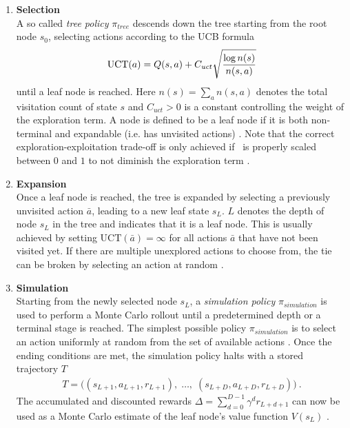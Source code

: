 \begin{enumerate}
    \item \textbf{Selection}\\
    A so called \emph{tree policy} $\pi_{tree}$ descends down the tree starting from the root node $s_0$, selecting actions according to the UCB formula
    \begin{gather}\label{eq:uct_formula}
        \text{UCT}(a) = \Q + C_{uct} \sqrt{\frac{\log n(s)}{n(s, a)}}
    \end{gather}
    until a leaf node is reached. Here $n(s) = \sum_a n(s, a)$ denotes the total visitation count of state $s$ and $C_{uct} > 0$ is a constant controlling the weight of the exploration term. A node is defined to be a leaf node if it is both non-terminal and expandable (i.e. has unvisited actions) \cite{browneSurveyMonteCarlo2012}.
    Note that the correct exploration-exploitation trade-off is only achieved if \Q\ is properly scaled between $0$ and $1$ to not diminish the exploration term \cite{browneSurveyMonteCarlo2012}.
    \item \textbf{Expansion}\\
    Once a leaf node is reached, the tree is expanded by selecting a previously unvisited action $\bar a$, leading to a new leaf state $s_L$. $L$ denotes the depth of node $s_L$ in the tree and indicates that it is a leaf node. This is usually achieved by setting $\text{UCT}(\bar a) = \infty$ for all actions $\bar a$ that have not been visited yet. If there are multiple unexplored actions to choose from, the tie can be broken by selecting an action at random \cite{browneSurveyMonteCarlo2012}.
    \item \textbf{Simulation}\\
    Starting from the newly selected node $s_L$, a \emph{simulation policy} $\pi_{simulation}$ is used to perform a Monte Carlo rollout until a predetermined depth or a terminal stage is reached. The simplest possible policy $\pi_{simulation}$ is to select an action uniformly at random from the set of available actions \actionspace. Once the ending conditions are met, the simulation policy halts with a stored trajectory $T$
    \begin{gather}\label{eq:simulation_trace}
    T = \big( (s_{L+1}, a_{L+1}, r_{L+1}), \; \ldots, \; (s_{L+D}, a_{L+D}, r_{L+D}) \big)~.
    \end{gather}
    The accumulated and discounted rewards $\Delta = \sum_{d=0}^{D-1} \gamma^d r_{L+d+1}$ can now be used as a Monte Carlo estimate of the leaf node's value function $V(s_L)$ \cite{moerlandA0CAlphaZero2018}.

\end{enumerate}
